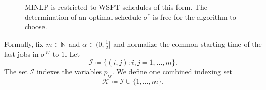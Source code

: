 \documentclass[%
english, titlepage=false %
]{./tum-templates/book/tumbook}
\newcommand{\machinerow}[2]{%
    \node[machine, anchor=east] at (-0.3,-#1+0.5) {$M_{#2}$};
}
\newcommand{\dotsrow}[1]{%
    \foreach \dy in {-0.18,0,0.18} { %
        \fill (-0.6,{-#1+0.5+\dy}) circle[radius=0.025];
        \fill (2,{-#1+0.5+\dy}) circle[radius=0.025];
    }
}
\newcommand{\jobblock}[5][white]{%
    \draw[job, fill=#1] (#3,-#2) rectangle ++(#4,1);
    \node at ({#3 + #4/2},{-#2 + 0.5}) {$#5$}; %
}
\begin{document}
\begin{figure}[ht]
\centering


\caption{MINLP is restricted to $\mathrm{WSPT}$-schedules of this form. The determination of an optimal schedule $\sigma^*$ is free for the algorithm to choose.}
\label{fig:computational-schedule-structure}
\end{figure}

Formally, fix \(m\in\mathbb{N}\) and \(\alpha \in\Big(0,\frac12\Big]\) and normalize the common starting
time of the last jobs in \(\sigma^W\) to \(1\). Let
\[
  \mathcal{I}\coloneqq\{(i,j): i,j=1,\ldots,m\}.
\]
The set \(\mathcal{I}\) indexes the variables \(p_{ij}\). We define
one combined indexing set
\[
  \mathcal{K}\coloneqq\mathcal{I}\cup\{1,\ldots,m\}.
\]
\end{document}
